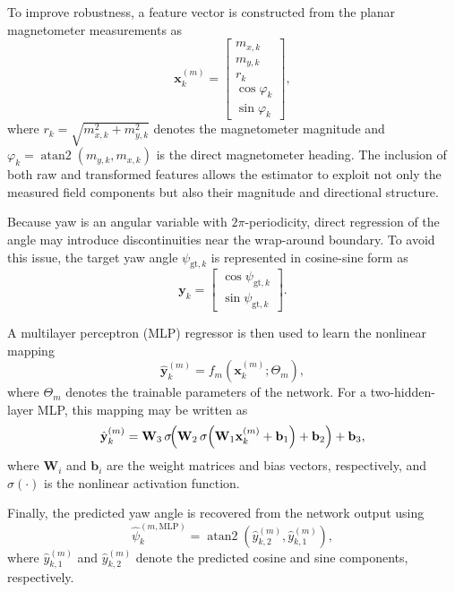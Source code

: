 \documentclass[subscriptcorrection,upint,varvw,barcolor=Goldenrod3,mathalfa=cal=euler,balance,hyphenate,pdf-a]{asmejour}
\begin{document}
To improve robustness, a feature vector is constructed from the planar magnetometer measurements as
\begin{equation}
\mathbf{x}^{(m)}_k =
\begin{bmatrix}
m_{x,k} \\
m_{y,k} \\
r_k \\
\cos \varphi_k \\
\sin \varphi_k
\end{bmatrix},
\end{equation}
where $r_k = \sqrt{m_{x,k}^2 + m_{y,k}^2}$ denotes the magnetometer magnitude and \(\varphi_k = \operatorname{atan2}(m_{y,k},m_{x,k})\) is the direct magnetometer heading. The inclusion of both raw and transformed features allows the estimator to exploit not only the measured field components but also their magnitude and directional structure.

Because yaw is an angular variable with \(2\pi\)-periodicity, direct regression of the angle may introduce discontinuities near the wrap-around boundary. To avoid this issue, the target yaw angle \(\psi_{\mathrm{gt},k}\) is represented in cosine-sine form as
\begin{equation}
\mathbf{y}_k =
\begin{bmatrix}
\cos \psi_{\mathrm{gt},k} \\
\sin \psi_{\mathrm{gt},k}
\end{bmatrix}.
\end{equation}

A multilayer perceptron (MLP) regressor is then used to learn the nonlinear mapping
\begin{equation}
\hat{\mathbf{y}}_k^{(m)} = f_m\!\left(\mathbf{x}^{(m)}_k;\Theta_m\right),
\end{equation}
where \(\Theta_m\) denotes the trainable parameters of the network. For a two-hidden-layer MLP, this mapping may be written as
\begin{equation}
\hat{\mathbf{y}}_k^{(m)}
=
\mathbf{W}_3 \,
\sigma\!\Bigl(
\mathbf{W}_2 \,
\sigma\!\left(
\mathbf{W}_1 \mathbf{x}^{(m)}_k + \mathbf{b}_1
\right)
+ \mathbf{b}_2
\Bigr)
+ \mathbf{b}_3,
\label{eqn:MLPEquation}
\end{equation}
where \(\mathbf{W}_i\) and \(\mathbf{b}_i\) are the weight matrices and bias vectors, respectively, and \(\sigma(\cdot)\) is the nonlinear activation function.

Finally, the predicted yaw angle is recovered from the network output using
\begin{equation}
\hat{\psi}_k^{(m,\mathrm{MLP})}
=
\operatorname{atan2}\!\left(\hat{y}_{k,2}^{(m)}, \hat{y}_{k,1}^{(m)}\right),
\end{equation}
where \(\hat{y}_{k,1}^{(m)}\) and \(\hat{y}_{k,2}^{(m)}\) denote the predicted cosine and sine components, respectively.
\end{document}
